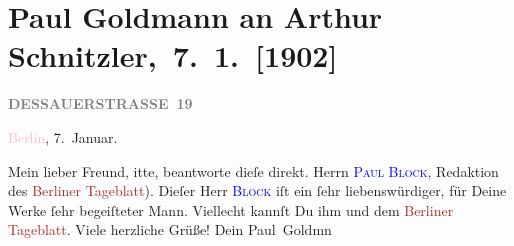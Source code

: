 

\renewcommand{\erwaehntePersonen}{Personen: Paul Block}
\renewcommand{\erwaehnteInstitutionen}{Institutionen: Berliner Tageblatt}
\renewcommand{\erwaehnteOrte}{Orte: Berlin, Dessauer Straße, Wien}
\renewcommand{\erwaehnteWerke}{}
\section[ Paul Goldmann an Arthur Schnitzler, 7. 1. {[}1902{]}]{Paul Goldmann an Arthur Schnitzler, 7. 1. {[}1902{]}}
\nopagebreak{}
\rehead{ }\normalsize\beginnumbering{}
\toendnotes[C]{\smallbreak\pagebreak[2]}
\toendnotes[C]{\smallbreak}
\pstart
           \noindent{}\raggedleft{}{\pb}\textcolor{pink}{\textcolor{gray}{\textbf{DESSAUERSTRASSE 19}}}{}\ledrightnote{\textcolor{pink}{Dessauer Straße}}\pend
           
\pstart
           \textcolor{pink}{Berlin}{}\ledrightnote{\textcolor{pink}{Berlin}}, 7. Januar.\pend
           
\pstart\center{}Mein lieber Freund,\pend
\pstart
           itte, beantworte dieſe \label{K_L03191-2v}\label{K_L03191-2h}
               direkt. \damage{(}Herrn \textsc{\textcolor{blue}{Paul Block}{}\ledrightnote{\textcolor{blue}{Paul Block}}}, Redaktion des \textcolor{brown}{Berliner Tageblatt}{}\ledrightnote{\textcolor{brown}{Berliner Tageblatt}}).  Dieſer Herr \textsc{\textcolor{blue}{Block}{}\ledrightnote{\textcolor{blue}{Paul Block}}} iſt ein ſehr liebenswürdiger, für Deine Werke ſehr begeiſteter Mann. Viellecht
               kannſt Du ihm und dem \textcolor{brown}{Berliner Tageblatt}{}\ledrightnote{\textcolor{brown}{Berliner Tageblatt}}{ }\label{K_L03191-1v}\label{K_L03191-1h}. Viele herzliche Grüße! Dein \spacefill\mbox{Paul
                  Goldmn}\pend
           \endnumbering{}
\begin{anhang}
\end{anhang}
      